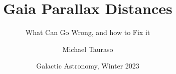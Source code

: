 \documentclass[hyperref={colorlinks = true, linkcolor=blue},8pt]{beamer}
\title[] %
{Gaia Parallax Distances}
\subtitle[]{What Can Go Wrong, and how to Fix it}
\author[] %
{Michael Tauraso}
\date[ASTRO 511, Galaxies] %
{Galactic Astronomy, Winter 2023}
\begin{document}
\begin{frame}
  \titlepage
\end{frame}


% 




%
 
%
%
% 
\end{document}
